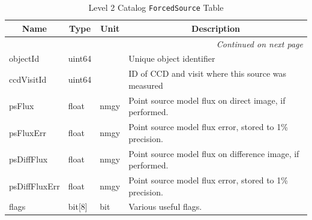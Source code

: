 \documentclass[12pt]{article}
\newcommand{\code}[1]{\texttt{#1}}
\newcommand{\ForcedSource}{\code{ForcedSource}\xspace}
\begin{document}
\begin{center}
\begin{longtable}{p{3cm}p{2cm}p{2cm}p{5cm}}
\caption[\ForcedSource Table]{Level 2 Catalog \ForcedSource Table
} \\

\hline \multicolumn{1}{c}{\bf Name} & \multicolumn{1}{c}{\bf Type} & \multicolumn{1}{c}{\bf Unit} & \multicolumn{1}{c}{\bf Description} \\ \hline
\endhead

\hline \multicolumn{4}{r}{{\em Continued on next page}} \\
\endfoot

\hline\hline
\endlastfoot

objectId & uint64 & ~ & Unique object identifier \\

ccdVisitId & uint64 & ~ & ID of CCD and visit where this source was measured \\


psFlux & float & nmgy & Point source model flux on direct image, if performed.\\

psFluxErr & float & nmgy & Point source model flux error,  stored to 1\% precision.\\

psDiffFlux & float & nmgy & Point source model flux on difference image, if performed.\\

psDiffFluxErr & float & nmgy & Point source model flux error,  stored to 1\% precision.\\



flags & bit[8] & bit & Various useful flags. \\ \hline
\end{longtable}
\end{center}
\end{document}
